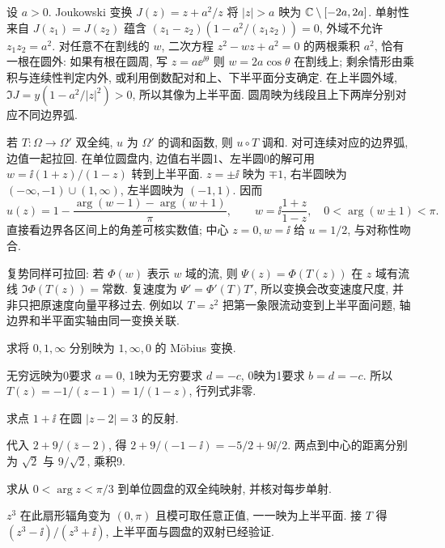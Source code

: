 设 $a>0$. Joukowski 变换 $J(z)=z+a^2/z$ 将 $|z|>a$ 映为 $\mathbb C\setminus[-2a,2a]$. 单射性来自 $J(z_1)=J(z_2)$ 蕴含 $(z_1-z_2)(1-a^2/(z_1z_2))=0$, 外域不允许 $z_1z_2=a^2$. 对任意不在割线的 $w$, 二次方程 $z^2-wz+a^2=0$ 的两根乘积 $a^2$, 恰有一根在圆外: 如果有根在圆周, 写 $z=a\ee^{\ii\theta}$ 则 $w=2a\cos\theta$ 在割线上; 剩余情形由乘积与连续性判定内外, 或利用倒数配对和上、下半平面分支确定. 在上半圆外域, $\Im J=y(1-a^2/|z|^2)>0$, 所以其像为上半平面. 圆周映为线段且上下两岸分别对应不同边界弧.

若 $T:\Omega\to\Omega'$ 双全纯, $u$ 为 $\Omega'$ 的调和函数, 则 $u\circ T$ 调和. 对可连续对应的边界弧, 边值一起拉回. 在单位圆盘内, 边值右半圆1、左半圆0的解可用 $w=\ii(1+z)/(1-z)$ 转到上半平面. $z=\pm\ii$ 映为 $\mp1$, 右半圆映为 $(-\infty,-1)\cup(1,\infty)$, 左半圆映为 $(-1,1)$. 因而
\[
u(z)=1-\frac{\arg(w-1)-\arg(w+1)}\pi,
\qquad w=\ii\frac{1+z}{1-z},\quad 0<\arg(w\pm1)<\pi.
\]
直接看边界各区间上的角差可核实数值; 中心 $z=0,w=\ii$ 给 $u=1/2$, 与对称性吻合.

复势同样可拉回: 若 $\Phi(w)$ 表示 $w$ 域的流, 则 $\Psi(z)=\Phi(T(z))$ 在 $z$ 域有流线 $\Im\Phi(T(z))=\text{常数}$. 复速度为 $\Psi'=\Phi'(T)T'$, 所以变换会改变速度尺度, 并非只把原速度向量平移过去. 例如以 $T=z^2$ 把第一象限流动变到上半平面问题, 轴边界和半平面实轴由同一变换关联.

\begin{exercise}
求将 $0,1,\infty$ 分别映为 $1,\infty,0$ 的 Möbius 变换.
\end{exercise}
\begin{solution}
无穷远映为0要求 $a=0$, 1映为无穷要求 $d=-c$, 0映为1要求 $b=d=-c$. 所以 $T(z)=-1/(z-1)=1/(1-z)$, 行列式非零.
\end{solution}
\begin{exercise}
求点 $1+\ii$ 在圆 $|z-2|=3$ 的反射.
\end{exercise}
\begin{solution}
代入 $2+9/(\bar z-2)$, 得 $2+9/(-1-\ii)=-5/2+9\ii/2$. 两点到中心的距离分别为 $\sqrt2$ 与 $9/\sqrt2$, 乘积9.
\end{solution}
\begin{exercise}
求从 $0<\arg z<\pi/3$ 到单位圆盘的双全纯映射, 并核对每步单射.
\end{exercise}
\begin{solution}
$z^3$ 在此扇形辐角变为 $(0,\pi)$ 且模可取任意正值, 一一映为上半平面. 接 $T$ 得 $(z^3-\ii)/(z^3+\ii)$, 上半平面与圆盘的双射已经验证.
\end{solution}
